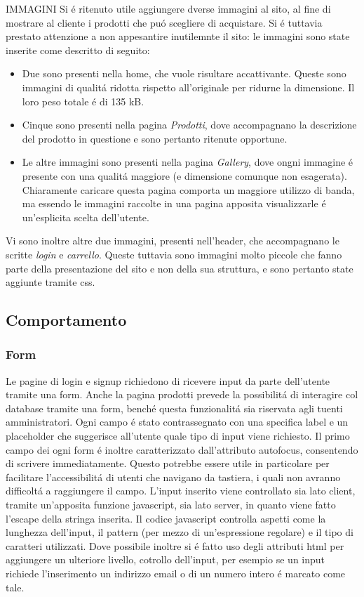 		IMMAGINI
		Si \'e ritenuto utile aggiungere dverse immagini al sito, al fine di mostrare al cliente i prodotti che pu\'o scegliere di acquistare.
		Si \'e tuttavia prestato attenzione a non appesantire inutilemnte il sito: le immagini sono state inserite come descritto di seguito:
		\begin{itemize}
		\item Due sono presenti nella home, che vuole risultare accattivante. Queste sono immagini di qualit\'a ridotta rispetto all'originale per ridurne la dimensione. Il loro peso totale \'e di 135 kB.
		\item Cinque sono presenti nella pagina \emph{Prodotti}, dove accompagnano la descrizione del prodotto in questione e sono pertanto ritenute opportune.
		\item Le altre immagini sono presenti nella pagina \emph{Gallery}, dove ongni immagine \'e presente con una qualit\'a maggiore (e dimensione comunque non esagerata). Chiaramente caricare questa pagina comporta un maggiore utilizzo di banda, ma essendo le immagini raccolte in una pagina apposita visualizzarle \'e un'esplicita scelta dell'utente.
		\end{itemize}
		Vi sono inoltre altre due immagini, presenti nell'header, che accompagnano le scritte \emph{login} e \emph{carrello}.
		Queste tuttavia sono immagini molto piccole che fanno parte della presentazione del sito e non della sua struttura, e sono pertanto state aggiunte tramite css.


    \subsection{Comportamento}
		\subsubsection{Form}
		Le pagine di login e signup richiedono di ricevere input da parte dell'utente tramite una form.
		Anche la pagina prodotti prevede la possibilit\'a di interagire col database tramite una form, bench\'e questa funzionalit\'a sia riservata agli tuenti amministratori.
		Ogni campo \'e stato contrassegnato con una specifica label e un placeholder che suggerisce all'utente quale tipo di input viene richiesto.
		Il primo campo dei ogni form \'e inoltre caratterizzato dall'attributo autofocus, consentendo di scrivere immediatamente.
		Questo potrebbe essere utile in particolare per facilitare l'accessibilit\'a di utenti che navigano da tastiera, i quali non avranno difficolt\'a  a raggiungere il campo.
		L'input inserito viene controllato sia lato client, tramite un'apposita funzione javascript, sia lato server, in quanto viene fatto l'escape della stringa inserita.
		Il codice javascript controlla aspetti come la lunghezza dell'input, il pattern (per mezzo di un'espressione regolare) e il tipo di caratteri utilizzati.
		Dove possibile inoltre si \'e fatto uso degli attributi html per aggiungere un ulteriore livello, cotrollo dell'input, per esempio se un input richiede l'inserimento un indirizzo email o di un numero intero \'e marcato come tale.


